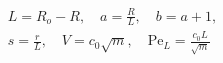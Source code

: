 $$
\begin{gathered}
L = R_o - R,\quad a = \frac{R}{L},\quad b = a + 1,\\
s = \frac{r}{L},\quad V = c_0 \sqrt{m},\quad \mathrm{Pe}_L = \frac{c_0 L}{\sqrt{m}}
\end{gathered}
$$
